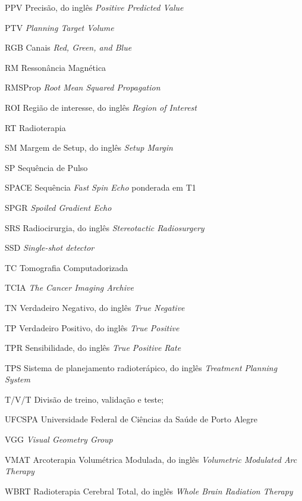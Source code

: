 \begin{siglas}
    \item[PPV] Precisão, do inglês \textit{Positive Predicted Value}
    \item[PTV] \textit{Planning Target Volume}
    \item[RGB] Canais \textit{Red, Green, and Blue}
    \item[RM] Ressonância Magnética
    \item[RMSProp] \textit{Root Mean Squared Propagation}
    \item[ROI] Região de interesse, do inglês \textit{Region of Interest}
    \item[RT] Radioterapia
    \item[SM] Margem de Setup, do inglês \textit{Setup Margin}
    \item[SP] Sequência de Pulso
    \item[SPACE] Sequência \textit{Fast Spin Echo} ponderada em T1
    \item[SPGR] \textit{Spoiled Gradient Echo}
    \item[SRS] Radiocirurgia, do inglês \textit{Stereotactic Radiosurgery}
    \item[SSD] \textit{Single-shot detector}
    \item[TC] Tomografia Computadorizada
    \item[TCIA] \textit{The Cancer Imaging Archive}
    \item[TN] Verdadeiro Negativo, do inglês \textit{True Negative}
    \item[TP] Verdadeiro Positivo, do inglês \textit{True Positive}
    \item[TPR] Sensibilidade, do inglês \textit{True Positive Rate}
    \item[TPS] Sistema de planejamento radioterápico, do inglês \textit{Treatment Planning System}
    \item[T/V/T] Divisão de treino, validação e teste;
	  \item[UFCSPA] Universidade Federal de Ciências da Saúde de Porto Alegre
    \item[VGG] \textit{Visual Geometry Group}
    \item[VMAT] Arcoterapia Volumétrica Modulada, do inglês \textit{Volumetric Modulated Arc Therapy}
    \item[WBRT] Radioterapia Cerebral Total, do inglês \textit{Whole Brain Radiation Therapy}
\end{siglas}
